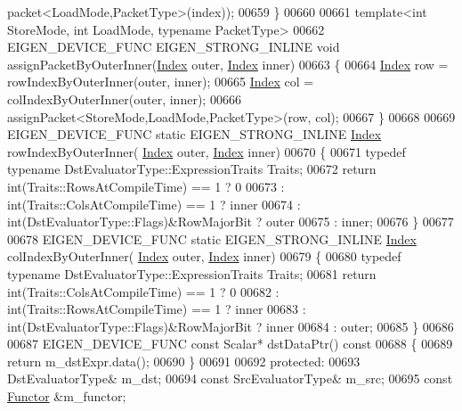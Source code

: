 \begin{DoxyCode}
      packet<LoadMode,PacketType>(index));
00659   \}
00660   
00661   \textcolor{keyword}{template}<\textcolor{keywordtype}{int} StoreMode, \textcolor{keywordtype}{int} LoadMode, \textcolor{keyword}{typename} PacketType>
00662   EIGEN\_DEVICE\_FUNC EIGEN\_STRONG\_INLINE \textcolor{keywordtype}{void} assignPacketByOuterInner(\hyperlink{namespace_eigen_a62e77e0933482dafde8fe197d9a2cfde}{Index} outer, 
      \hyperlink{namespace_eigen_a62e77e0933482dafde8fe197d9a2cfde}{Index} inner)
00663   \{
00664     \hyperlink{namespace_eigen_a62e77e0933482dafde8fe197d9a2cfde}{Index} row = rowIndexByOuterInner(outer, inner); 
00665     \hyperlink{namespace_eigen_a62e77e0933482dafde8fe197d9a2cfde}{Index} col = colIndexByOuterInner(outer, inner);
00666     assignPacket<StoreMode,LoadMode,PacketType>(row, col);
00667   \}
00668   
00669   EIGEN\_DEVICE\_FUNC \textcolor{keyword}{static} EIGEN\_STRONG\_INLINE \hyperlink{namespace_eigen_a62e77e0933482dafde8fe197d9a2cfde}{Index} rowIndexByOuterInner(
      \hyperlink{namespace_eigen_a62e77e0933482dafde8fe197d9a2cfde}{Index} outer, \hyperlink{namespace_eigen_a62e77e0933482dafde8fe197d9a2cfde}{Index} inner)
00670   \{
00671     \textcolor{keyword}{typedef} \textcolor{keyword}{typename} DstEvaluatorType::ExpressionTraits Traits;
00672     \textcolor{keywordflow}{return} int(Traits::RowsAtCompileTime) == 1 ? 0
00673       : int(Traits::ColsAtCompileTime) == 1 ? inner
00674       : int(DstEvaluatorType::Flags)&RowMajorBit ? outer
00675       : inner;
00676   \}
00677 
00678   EIGEN\_DEVICE\_FUNC \textcolor{keyword}{static} EIGEN\_STRONG\_INLINE \hyperlink{namespace_eigen_a62e77e0933482dafde8fe197d9a2cfde}{Index} colIndexByOuterInner(
      \hyperlink{namespace_eigen_a62e77e0933482dafde8fe197d9a2cfde}{Index} outer, \hyperlink{namespace_eigen_a62e77e0933482dafde8fe197d9a2cfde}{Index} inner)
00679   \{
00680     \textcolor{keyword}{typedef} \textcolor{keyword}{typename} DstEvaluatorType::ExpressionTraits Traits;
00681     \textcolor{keywordflow}{return} int(Traits::ColsAtCompileTime) == 1 ? 0
00682       : int(Traits::RowsAtCompileTime) == 1 ? inner
00683       : int(DstEvaluatorType::Flags)&RowMajorBit ? inner
00684       : outer;
00685   \}
00686 
00687   EIGEN\_DEVICE\_FUNC \textcolor{keyword}{const} Scalar* dstDataPtr()\textcolor{keyword}{ const}
00688 \textcolor{keyword}{  }\{
00689     \textcolor{keywordflow}{return} m\_dstExpr.data();
00690   \}
00691   
00692 \textcolor{keyword}{protected}:
00693   DstEvaluatorType& m\_dst;
00694   \textcolor{keyword}{const} SrcEvaluatorType& m\_src;
00695   \textcolor{keyword}{const} \hyperlink{struct_functor}{Functor} &m\_functor;

\end{DoxyCode}
